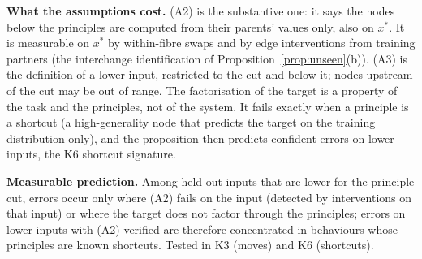 \textbf{What the assumptions cost.} (A2) is the substantive one: it says the
nodes below the principles are computed from their parents' values only,
also on $x^\ast$. It is measurable on $x^\ast$ by within-fibre swaps and by
edge interventions from training partners (the interchange identification of
Proposition~\ref{prop:unseen}(b)). (A3) is the definition of a lower input,
restricted to the cut and below it; nodes upstream of the cut may be out of
range. The factorisation of the target is a property of the task and the
principles, not of the system. It fails exactly when a principle is a
shortcut (a high-generality node that predicts the target on the training
distribution only), and the proposition then predicts confident errors on
lower inputs, the K6 shortcut signature.

\textbf{Measurable prediction.} Among held-out inputs that are lower for the
principle cut, errors occur only where (A2) fails on the input (detected by
interventions on that input) or where the target does not factor through the
principles; errors on lower inputs with (A2) verified are therefore
concentrated in behaviours whose principles are known shortcuts. Tested in
K3 (moves) and K6 (shortcuts).
